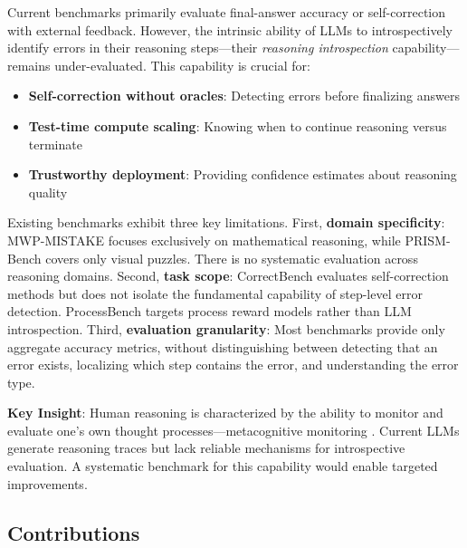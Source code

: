 \documentclass{article}
\begin{document}
Current benchmarks primarily evaluate final-answer accuracy or self-correction with external feedback. However, the intrinsic ability of LLMs to introspectively identify errors in their reasoning steps---their \textit{reasoning introspection} capability---remains under-evaluated. This capability is crucial for:
\begin{itemize}
    \item \textbf{Self-correction without oracles}: Detecting errors before finalizing answers
    \item \textbf{Test-time compute scaling}: Knowing when to continue reasoning versus terminate
    \item \textbf{Trustworthy deployment}: Providing confidence estimates about reasoning quality
\end{itemize}

Existing benchmarks exhibit three key limitations. First, \textbf{domain specificity}: MWP-MISTAKE \citep{singh2025exposing} focuses exclusively on mathematical reasoning, while PRISM-Bench covers only visual puzzles. There is no systematic evaluation across reasoning domains. Second, \textbf{task scope}: CorrectBench \citep{tie2025correctbench} evaluates self-correction methods but does not isolate the fundamental capability of step-level error detection. ProcessBench \citep{zheng2024processbench} targets process reward models rather than LLM introspection. Third, \textbf{evaluation granularity}: Most benchmarks provide only aggregate accuracy metrics, without distinguishing between detecting that an error exists, localizing which step contains the error, and understanding the error type.

\textbf{Key Insight}: Human reasoning is characterized by the ability to monitor and evaluate one's own thought processes---metacognitive monitoring \citep{flavell1979metacognition, brown1987metacognition}. Current LLMs generate reasoning traces but lack reliable mechanisms for introspective evaluation. A systematic benchmark for this capability would enable targeted improvements.

\subsection{Contributions}
\end{document}
